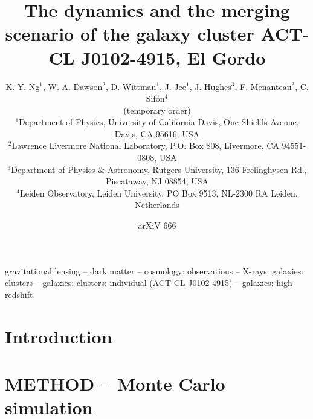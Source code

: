 \documentclass[letterpaper,useAMS,usenatbib]{"mn2e"}
\title[El Gordo]{The dynamics and the merging scenario of the galaxy cluster 
ACT-CL J0102-4915, 
El Gordo}
\author[author]{K. Y. Ng$^{1}$, W. A. Dawson$^{2}$, D. Wittman$^{1}$, J.
Jee$^{1}$, J. Hughes$^{3}$, F. Menanteau$^{3}$, C. Sif\'{o}n$^{4}$\\
(temporary order)\\
$^{1}$Department of Physics, University of California Davis, One Shields
Avenue, Davis, CA 95616, USA\\ 
$^{2}$Lawrence Livermore National Laboratory, P.O. Box 808, Livermore, CA
94551-0808, USA \\
$^3$Department of Physics \& Astronomy,
Rutgers University, 136 Frelinghysen Rd., Piscataway, NJ 08854, USA\\
$^{4}$Leiden Observatory, Leiden University, PO Box 9513, NL-2300 RA
Leiden, Netherlands\\}
\begin{document}

\date{arXiV 666} \pagerange{\pageref{firstpage}--\pageref{lastpage}}
 \maketitle \label{firstpage}
\begin{abstract} 
    
\end{abstract}

\begin{keywords}
gravitational lensing -- dark matter -- cosmology: observations -- X-rays:
galaxies: clusters -- galaxies: clusters: individual (ACT-CL J0102-4915) --
galaxies: high redshift 
\end{keywords}

\section{Introduction} 


\section[]{METHOD -- Monte Carlo simulation} 

\end{document}
